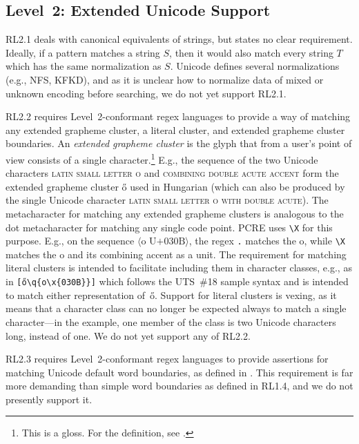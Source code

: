 \documentclass[5p,final,number,sort&compress]{elsarticle}
\newcommand{\re}[1]{\texttt{#1}}
\newcommand*{\whack}{\textbackslash}
\begin{document}
\subsection{Level~2: Extended Unicode Support}

RL2.1 deals with canonical equivalents of strings, but states no clear requirement. Ideally, if a pattern matches a string $S$, then it would also match every string $T$ which has the same normalization as $S$. Unicode defines several normalizations (e.g., NFS, KFKD), and as it is unclear how to normalize data of mixed or unknown encoding before searching, we do not yet support RL2.1.

RL2.2 requires Level~2-conformant regex languages to provide a way of matching any extended grapheme cluster, a literal cluster, and extended grapheme cluster boundaries. An \emph{extended grapheme cluster} is the glyph that from a user's point of view consists of a single character.\footnote{This is a gloss. For the definition, see \citep[\S 3]{uax29}.} E.g., the sequence of the two Unicode characters \textsc{latin small letter o} and \textsc{combining double acute accent} form the extended grapheme cluster \H{o} used in Hungarian (which can also be produced by the single Unicode character \textsc{latin small letter o with double acute}). The metacharacter for matching any extended grapheme clusters is analogous to the dot metacharacter for matching any single code point. PCRE uses \re{\whack X} for this purpose. E.g., on the sequence $\langle \text{o U+030B} \rangle$, the regex \re{.} matches the o, while \re{\whack X} matches the o and its combining accent as a unit. The requirement for matching literal clusters is intended to facilitate including them in character classes, e.g., as in \re{[\H{o}\whack q\{o\whack x\{030B\}\}]} which follows the UTS~\#18 sample syntax and is intended to match either representation of~\H{o}. Support for literal clusters is vexing, as it means that a character class can no longer be expected always to match a single character---in the example, one member of the class is two Unicode characters long, instead of one. We do not yet support any of RL2.2.

RL2.3 requires Level~2-conformant regex languages to provide assertions for matching Unicode default word boundaries, as defined in \citep[\S 4]{uax29}. This requirement is far more demanding than simple word boundaries as defined in RL1.4, and we do not presently support it.
\end{document}
